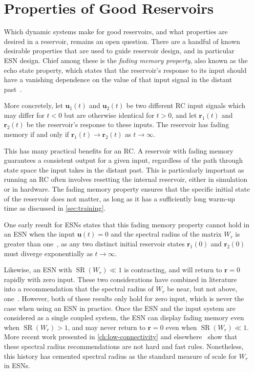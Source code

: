 \section{Properties of Good Reservoirs}\label{sec:reservoir-properties}

Which dynamic systems make for good reservoirs, and what properties
are desired in a reservoir, remains an open question. There are a
handful of known desirable properties that are used to guide reservoir
design, and in particular ESN design. Chief among these is the
\emph{fading memory property}, also known as the echo state property, which states that the reservoir's
response to its input should have a vanishing dependence on the value
of that input signal in the distant past~\cite{jaeger2001,jaeger2002}.

More concretely, let $\bm{u}_1(t)$ and $\bm{u}_2(t)$ be two different
RC input signals which may differ for $t < 0$ but are otherwise
identical for $t > 0$, and let $\bm{r}_1(t)$ and $\bm{r}_2(t)$ be the
reservoir's response to these inputs. The reservoir has fading memory
if and only if $\bm{r}_1(t) \rightarrow \bm{r}_2(t)$ as $t \rightarrow \infty$.

This has many practical benefits for an RC. A reservoir with fading
memory guarantees a consistent output for a given input, regardless of
the path through state space the input takes in the distant past. This
is particularly important as running an RC often involves
resetting the internal reservoir, either in simulation or in
hardware. The fading memory property ensures that the specific initial
state of the reservoir does not matter, as long as it has a
sufficiently long warm-up time as discussed in \cref{sec:training}.

One early result for ESNs states that this fading memory property
cannot hold in an ESN when the input $\bm{u}(t) = 0$ and the spectral radius
of the matrix $W_r$ is greater than one~\cite{jaeger2001},
as any two distinct initial reservoir states
$\bm{r}_1(0)$ and $\bm{r}_2(0)$ must diverge exponentially as $t
\rightarrow \infty$.

Likewise, an ESN with $\operatorname{SR}(W_r) \ll 1$ is contracting,
and will return to $\bm{r} = 0$ rapidly with zero input. These two
considerations have combined in literature into a recommendation that
the spectral radius of $W_r$ be near, but not above,
one~\cite{lukosevicius2012}. However, both of these results only hold
for zero input, which is never the case when using an ESN in practice.
Once the ESN and the input system are considered as a single coupled
system, the ESN can display fading memory even when
$\operatorname{SR}(W_r) > 1$, and may never return to $\bm{r} = 0$
even when $\operatorname{SR}(W_r) \ll 1$.  More recent work presented
in \cref{ch:low-connectivity} and
elsewhere~\cite{pathak2017,rodan2011} show that these spectral radius
recommendations are not hard and fast rules. Nonetheless, this history
has cemented spectral radius as the standard measure of scale for
$W_r$ in ESNs.

